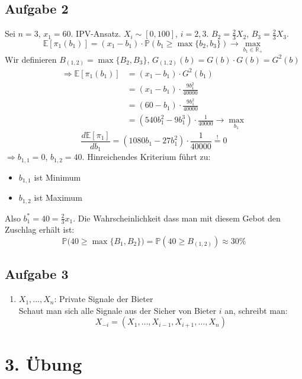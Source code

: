 \documentclass[12pt]{extreport} %
\newcommand{\R}{\mathbb{R}}
\theoremstyle{named}
\theoremstyle{itshape}
\theoremstyle{normal}
\begin{document}
\subsection*{Aufgabe 2}

Sei $n = 3$, $x_1 = 60$. IPV-Ansatz. $X_i \sim [0, 100]$, $i = 2,3$. $B_2 = \frac{2}{3} X_2$, $B_3 = \frac{2}{3} X_3$.
$$ \mathds{E} \left[ \pi_1(b_1) \right] = \left( x_1 - b_1 \right) \cdot \mathds{P} \left( b_1 \geq \max \{ b_2, b_3 \} \right) \rightarrow \max_{b_1 \in \R_+} $$
Wir definieren $B_{(1,2)} = \max \{ B_2, B_3 \}$, $G_{(1,2)}(b) = G(b) \cdot G(b) = G^{2}(b)$
\begin{align*}
	\Rightarrow \mathds{E} \left[ \pi_1(b_1) \right] & = (x_1 - b_1) \cdot G^{2}(b_1) \\
				& = (x_1 - b_1) \cdot \frac{9 b_1^2}{40000} \\
				& = (60 - b_1) \cdot \frac{9 b_1^2}{40000} \\
				& = \left( 540 b_1^2 - 9 b_1^3 \right) \cdot \frac{
				1}{40000} \rightarrow \max_{b_1}
\end{align*}
$$ \frac{d \mathds{E}[\pi_1]}{d b_1} = \left( 1080 b_1 - 27 b_1^2 \right) \cdot \frac{1}{40000} \overset{!}{=} 0 $$
$\Rightarrow b_{1,1} = 0$, $b_{1,2} = 40$. Hinreichendes Kriterium führt zu: 
\begin{itemize}
	\item $b_{1,1}$ ist Minimum
	\item $b_{1,2}$ ist Maximum
\end{itemize}
Also $b_1^* = 40 = \frac{2}{3} x_1$. Die Wahrscheinlichkeit dass man mit diesem Gebot den Zuschlag erhält ist:
$$ \mathds{P} \big( 40 \geq \max \{ B_1, B_2 \} \big) = \mathds{P} \left( 40 \geq B_{(1,2)} \right) \approx 30 \% $$

\subsection*{Aufgabe 3}

\begin{enumerate}
	\item $X_1, \dotsc, X_n$: Private Signale der Bieter ~\\
		Schaut man sich alle Signale aus der Sicher von Bieter $i$ an, schreibt man:
		$$ X_{-i} = \left( X_1, \dotsc, X_{i-1}, X_{i+1}, \dotsc, X_{n} \right) $$
\end{enumerate}

\newpage

\section*{3. Übung}
\end{document}
